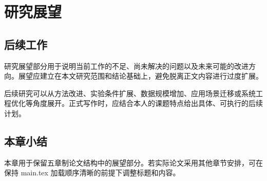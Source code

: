 
\section{研究展望}

\subsection{后续工作}
\thesisbodyfont
研究展望部分用于说明当前工作的不足、尚未解决的问题以及未来可能的改进方向。展望应建立在本文研究范围和结论基础上，避免脱离正文内容进行过度扩展。\par
后续研究可以从方法改进、实验条件扩展、数据规模增加、应用场景迁移或系统工程优化等角度展开。正式写作时，应结合本人的课题特点给出具体、可执行的后续计划。

\subsection{本章小结}
\thesisbodyfont
本章用于保留五章制论文结构中的展望部分。若实际论文采用其他章节安排，可在保持 main.tex 加载顺序清晰的前提下调整标题和内容。
